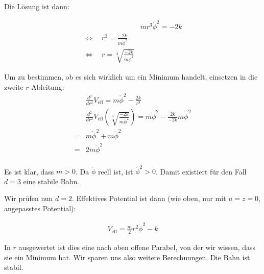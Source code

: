 \documentclass[a4paper,german,12pt,smallheadings]{scrartcl}
\begin{document}
Die Lösung ist dann:

\begin{align*}
  &mr^3\dot{\phi}^2 = -2k \\
  \Leftrightarrow\quad r^3 = \frac{-2k}{m\dot{\phi}^2} \\
  \Leftrightarrow\quad r = \sqrt[3]{\frac{-2k}{m\dot{\phi}^2}}
\end{align*}

Um zu bestimmen, ob es sich wirklich um ein Minimum handelt, einsetzen in die zweite $r$-Ableitung:
\begin{align*}
  &\frac{d^2}{dr^2} V_{\text{eff}} = m\dot{\phi}^2 - \frac{2k}{r^3}\\
  &\frac{d^2}{dr^2} V_{\text{eff}}(\sqrt[3]{\frac{-2k}{m\dot{\phi}^2}}) =  m\dot{\phi}^2 - \frac{2k}{-2k} m\dot{\phi}^2 \\
  = &m\dot{\phi}^2 + m\dot{\phi}^2 \\
  = &2m\dot{\phi}^2\\
\end{align*}

Es ist klar, dass $m > 0$. Da $\dot{\phi}$ reell ist, ist $\dot{\phi}^2 > 0$. Damit existiert für den Fall $d=3$ eine stabile Bahn.

Wir prüfen nun $d=2$. Effektives Potential ist dann (wie oben, nur mit $u=z=0$, angepasstes Potential):

\begin{align*}
  V_{\text{eff}} = \frac{m}{2}r^2\dot{\phi}^2 - k
\end{align*}

In $r$ ausgewertet ist dies eine nach oben offene Parabel, von der wir wissen,
dass sie ein Minimum hat. Wir sparen uns also weitere Berechnungen. Die Bahn
ist stabil.
\end{document}
